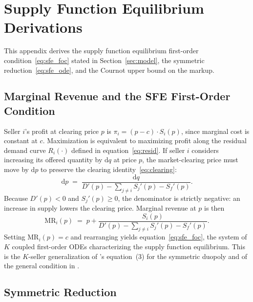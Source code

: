 
\section{Supply Function Equilibrium Derivations}
\label{app:derivations}

This appendix derives the supply function equilibrium first-order
condition~\eqref{eq:sfe_foc} stated in Section~\ref{sec:model}, the
symmetric reduction~\eqref{eq:sfe_ode}, and the Cournot upper bound on
the markup.

\subsection{Marginal Revenue and the SFE First-Order Condition}
\label{app:foc_derivation}

Seller $i$'s profit at clearing price $p$ is
$\pi_i = (p - c) \cdot S_i(p)$, since marginal cost is constant at $c$.
Maximization is equivalent to maximizing profit along the residual demand
curve $R_i(\cdot)$ defined in equation~\eqref{eq:resid}. If seller $i$
considers increasing its offered quantity by $\mathrm{d}q$ at price $p$,
the market-clearing price must move by $\mathrm{d}p$ to preserve the
clearing identity~\eqref{eq:clearing}:
\begin{equation}
  \mathrm{d}p
  \;=\; \frac{\mathrm{d}q}{D'(p) - \sum_{j \neq i} S_j'(p) - S_f'(p)}.
  \label{eq:dprice}
\end{equation}
Because $D'(p) < 0$ and $S_j'(p) \geq 0$, the denominator is strictly
negative: an increase in supply lowers the clearing price. Marginal
revenue at $p$ is then
\begin{equation}
  \text{MR}_i(p)
  \;=\; p + \frac{S_i(p)}{D'(p) - \sum_{j \neq i} S_j'(p) - S_f'(p)}.
  \label{eq:mr}
\end{equation}
Setting $\text{MR}_i(p) = c$ and rearranging yields
equation~\eqref{eq:sfe_foc}, the system of $K$ coupled first-order ODEs
characterizing the supply function equilibrium. This is the $K$-seller
generalization of \citet{Green1992_british}'s equation~(3) for the
symmetric duopoly and of the general condition in
\citet{Anderson2008_sfe_asymmetric}.

\subsection{Symmetric Reduction}
\label{app:symmetric_derivation}

